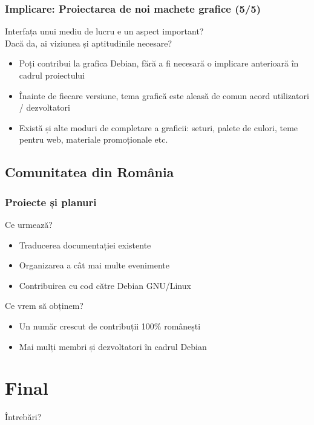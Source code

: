 \documentclass[xcolor=dvipsnames]{beamer}
\begin{document}
\begin{frame}
\frametitle{Implicare: Proiectarea de noi machete grafice (5/5)}
\begin{block}{}
Interfața unui mediu de lucru e un aspect important?\\
Dacă da, ai viziunea și aptitudinile necesare?
\begin{itemize}
\item Poți contribui la grafica Debian, fără a fi necesară o implicare anterioară în cadrul proiectului
\item Înainte de fiecare versiune, tema grafică este aleasă de comun acord utilizatori / dezvoltatori
\item Există și alte moduri de completare a graficii: seturi, palete de culori, teme pentru web, materiale promoționale etc.
\end{itemize}
\end{block}
\end{frame}

\subsection{Comunitatea din România}
\begin{frame}
\frametitle{Proiecte și planuri}
\begin{block}{Ce urmează?}
\begin{itemize}
\item Traducerea documentației existente
\item Organizarea a cât mai multe evenimente
\item Contribuirea cu cod către Debian GNU/Linux
\end{itemize}
\end{block}
\begin{block}{Ce vrem să obținem?}
\begin{itemize}
\item Un număr crescut de contribuții 100\% românești
\item Mai mulți membri și dezvoltatori în cadrul Debian
\end{itemize}
\end{block}
\end{frame}

\section{Final} 
\begin{frame}
\centerline{Întrebări?}
\end{frame}
\end{document}
